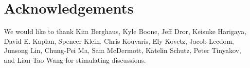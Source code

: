 \documentclass[preprintnumbers,amsmath,amssymb,prd,superscriptaddress]{revtex4}
\begin{document}
\section*{Acknowledgements}
We would like to thank Kim Berghaus, Kyle Boone, Jeff Dror, Keisuke Harigaya, David E. Kaplan, Spencer Klein, Chris Kouvaris, Ely Kovetz, Jacob Leedom, Junsong Lin, Chung-Pei Ma, Sam McDermott, Katelin Schutz, Peter Tinyakov, and Lian-Tao Wang for stimulating discussions.

\begin{thebibliography}{99}


\end{thebibliography}
\end{document}
